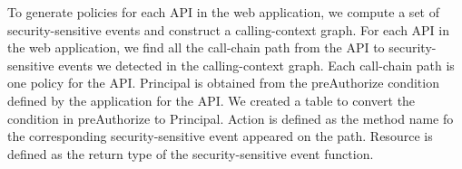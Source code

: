 To generate policies for each API in the web application, we compute a set of
security-sensitive events and construct a calling-context graph.
%
For each API in the web application, we find all the call-chain path from the
API to security-sensitive events we detected in the calling-context graph.
%
Each call-chain path is one policy for the API.
%
Principal is obtained from the preAuthorize condition defined by the application
for the API.
%
We created a table to convert the condition in preAuthorize to Principal.
%
Action is defined as the method name fo the corresponding security-sensitive
event appeared on the path.
%
Resource is defined as the return type of the security-sensitive event function.
